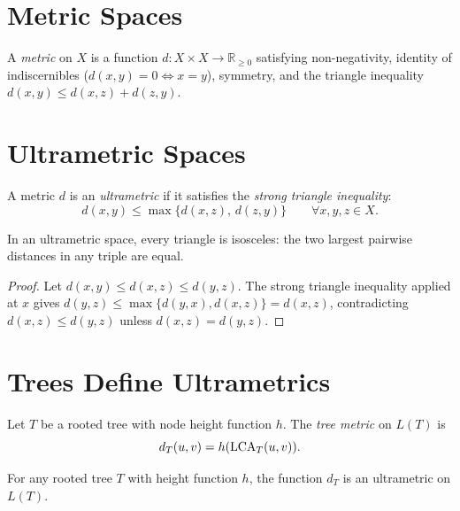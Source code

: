 \section{Metric Spaces}

\begin{definition}[Metric]
A \emph{metric} on $X$ is a function $d : X \times X \to \mathbb{R}_{\geq 0}$ satisfying non-negativity, identity of indiscernibles ($d(x,y)=0 \iff x=y$), symmetry, and the triangle inequality $d(x,y) \leq d(x,z) + d(z,y)$.
\end{definition}

\section{Ultrametric Spaces}

\begin{definition}[Ultrametric]
A metric $d$ is an \emph{ultrametric} if it satisfies the \emph{strong triangle inequality}:
\[
d(x,y) \leq \max\{d(x,z),\, d(z,y)\} \qquad \forall x, y, z \in X.
\]
\end{definition}

\begin{proposition}
\label{prop:isosceles}
In an ultrametric space, every triangle is isosceles: the two largest pairwise distances in any triple are equal.
\end{proposition}

\begin{proof}
Let $d(x,y) \leq d(x,z) \leq d(y,z)$. The strong triangle inequality applied at $x$ gives $d(y,z) \leq \max\{d(y,x), d(x,z)\} = d(x,z)$, contradicting $d(x,z) \leq d(y,z)$ unless $d(x,z) = d(y,z)$.
\end{proof}

\section{Trees Define Ultrametrics}

\begin{definition}
Let $T$ be a rooted tree with node height function $h$. The \emph{tree metric} on $L(T)$ is
\[
d_T(u, v) = h(\operatorname{LCA}_T(u,v)).
\]
\end{definition}

\begin{theorem}
\label{thm:tree_ultrametric}
For any rooted tree $T$ with height function $h$, the function $d_T$ is an ultrametric on $L(T)$.
\end{theorem}

